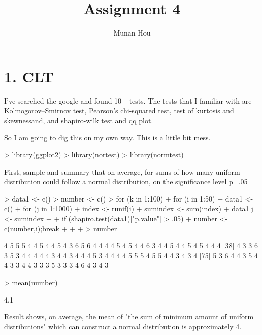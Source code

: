 \documentclass[a4paper]{article}
\title{Assignment 4}
\author{Munan Hou}
\begin{document}


\maketitle{}

\section{1. CLT}

I've searched the google and found 10+ tests. The tests that I familiar with are Kolmogorov–Smirnov test, Pearson's chi-squared test, test of kurtosis and skewnessand, and shapiro-wilk test and qq plot.

So I am going to dig this on my own way. This is a little bit mess.

\begin{Schunk}
\begin{Sinput}
> library(ggplot2)
> library(nortest)
> library(normtest)
\end{Sinput}
\end{Schunk}

First, sample and summary that on average, for sums of how many uniform distribution could follow a normal distribution, on the significance level p=.05

\begin{Schunk}
\begin{Sinput}
> data1 <- c()
> number <- c()
> for (k in 1:100) {
+   for (i in 1:50) {
+     data1 <- c()
+     for (j in 1:1000) {
+       index <- runif(i)
+       sumindex <- sum(index)
+       data1[j] <- sumindex
+     }
+     if (shapiro.test(data1)["p.value"] > .05) {
+       number <- c(number,i);break
+     }
+   }
+ }
> number
\end{Sinput}
\begin{Soutput}
  [1] 4 5 5 5 4 4 5 4 4 5 4 3 6 5 6 4 4 4 4 5 4 5 4 4 6 3 4 4 5 4 4 5 4 5 4 4 4
 [38] 4 3 3 6 3 5 3 4 4 4 4 4 3 4 4 3 4 4 4 5 3 4 4 4 4 5 5 5 4 5 5 4 4 3 4 3 4
 [75] 5 3 6 4 4 3 5 4 4 3 3 4 4 3 3 3 5 3 3 3 4 6 4 3 4 3
\end{Soutput}
\begin{Sinput}
> mean(number)
\end{Sinput}
\begin{Soutput}
[1] 4.1
\end{Soutput}
\end{Schunk}

Result shows, on average, the mean of "the sum of minimum amount of uniform distributions" which can construct a normal distribution is approximately 4.
\end{document}
